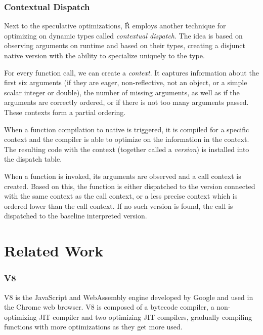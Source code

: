 \subsubsection*{Contextual Dispatch}\label{ch:1-ctx-dispatch}

Next to the speculative optimizations, Ř employs another technique for optimizing on dynamic types called \textit{contextual dispatch}\cite{ctx-dispatch}. The idea is based on observing arguments on runtime and based on their types, creating a disjunct native version with the ability to specialize uniquely to the type.

For every function call, we can create a \textit{context}. It captures information about the first six arguments (if they are eager, non-reflective, not an object, or a simple scalar integer or double), the number of missing arguments, as well as if the arguments are correctly ordered, or if there is not too many arguments passed. These contexts form a partial ordering.

When a function compilation to native is triggered, it is compiled for a specific context and the compiler is able to optimize on the information in the context. The resulting code with the context (together called a \textit{version}) is installed into the dispatch table.

When a function is invoked, its arguments are observed and a call context is created. Based on this, the function is either dispatched to the version connected with the same context as the call context, or a less precise context which is ordered lower than the call context. If no such version is found, the call is dispatched to the baseline interpreted version.

\section{Related Work}

\subsubsection*{V8}

V8\cite{v8} is the JavaScript and WebAssembly engine developed by Google and used in the Chrome web browser. V8 is composed of a bytecode compiler, a non-optimizing JIT compiler and two optimizing JIT compilers, gradually compiling functions with more optimizations as they get more used.

